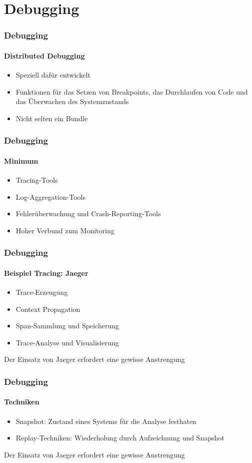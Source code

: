 \section{Debugging}
\begin{frame}
  \frametitle{Debugging}
  \framesubtitle{Distributed Debugging}
  \begin{itemize}
    \item Speziell dafür entwickelt
    \item Funktionen für das Setzen von Breakpoints, das Durchlaufen von Code und das Überwachen des Systemzustands
    \item Nicht selten ein Bundle 
  \end{itemize}
\end{frame}

\begin{frame}
  \frametitle{Debugging}
  \framesubtitle{Minimum}
  \begin{itemize}
    \item Tracing-Tools
    \item Log-Aggregation-Tools
    \item Fehlerüberwachung und Crash-Reporting-Tools
    \item Hoher Verbund zum Monitoring
  \end{itemize}
\end{frame}

\begin{frame}
  \frametitle{Debugging}
  \framesubtitle{Beispiel Tracing: Jaeger}
  \begin{itemize}
    \item Trace-Erzeugung
    \item Context Propagation
    \item Span-Sammlung und Speicherung 
    \item Trace-Analyse und Visualisierung
  \end{itemize}
  Der Einsatz von Jaeger erfordert eine gewisse Anstrengung
\end{frame}

\begin{frame}
  \frametitle{Debugging}
  \framesubtitle{Techniken}
  \begin{itemize}
    \item Snapshot: Zustand eines Systems für die Analyse festhaten
    \item Replay-Techniken: Wiederholung durch Aufzeichnung und Snapshot
  \end{itemize}
  Der Einsatz von Jaeger erfordert eine gewisse Anstrengung
\end{frame}

